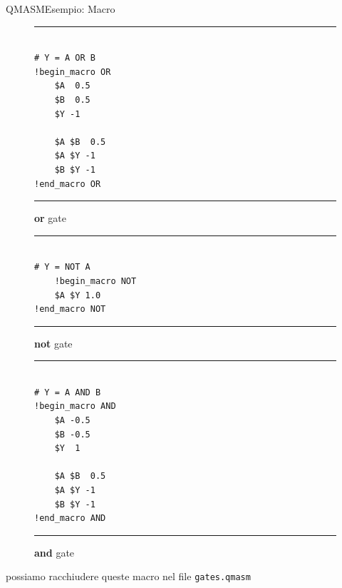 \begin{frame}[fragile]{QMASM}{Esempio: Macro}
	\begin{minipage}{.3\linewidth}
		\begin{figure}[h]
			\begin{minipage}{\linewidth}
				\hrule
				\begin{verbatim}
					
# Y = A OR B
!begin_macro OR
	$A  0.5
	$B  0.5
	$Y -1
	
	$A $B  0.5
	$A $Y -1
	$B $Y -1
!end_macro OR
				\end{verbatim}
				\hrule
			\end{minipage}
			\caption{\textbf{or} gate}
		\end{figure}
	\end{minipage}
	\hfill
	\begin{minipage}{.3\linewidth}
		\begin{figure}[h]
			\begin{minipage}{\linewidth}
				\hrule
				\begin{verbatim}
					
# Y = NOT A
	!begin_macro NOT
	$A $Y 1.0
!end_macro NOT
				\end{verbatim}
				\hrule
			\end{minipage}
			\caption{\textbf{not} gate}
		\end{figure}
	\end{minipage}
	\hfill
	\begin{minipage}{.3\linewidth}
		\begin{figure}[h]
			\begin{minipage}{\linewidth}
				\hrule
				\begin{verbatim}

# Y = A AND B
!begin_macro AND
	$A -0.5
	$B -0.5
	$Y  1
	
	$A $B  0.5
	$A $Y -1
	$B $Y -1
!end_macro AND
				\end{verbatim}
				\hrule
			\end{minipage}
			\caption{\textbf{and} gate}
		\end{figure}
	\end{minipage}
	\begin{block}{}
		\centering
		possiamo racchiudere queste macro nel file \texttt{gates.qmasm}
	\end{block}
\end{frame}

